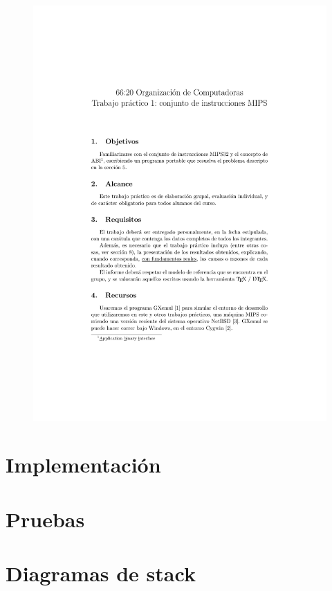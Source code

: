 \documentclass[a4paper, 12pt]{article}
\begin{document}
	\newpage
	\begin{figure}[H]
		\centering
		\includegraphics[scale=1, page = 5, clip, trim=20mm 36mm 20mm 20mm]{files/enunciado.pdf}
	\end{figure}

	\section{Implementación}
	
	\section{Pruebas}
	
	\section{Diagramas de stack}
	
\end{document}
